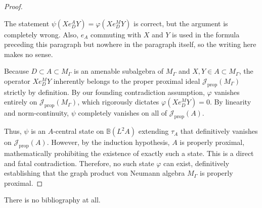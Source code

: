 \documentclass[12pt]{article}
\newcommand{\review}[1]{\begin{reviewbox}#1\end{reviewbox}}
\begin{document}
\begin{proof}
\review{The statement $\psi(X e_D^A Y) = \varphi(X e_D^M Y)$ is correct, but the argument is completely wrong. Also, $e_A$ commuting with $X$ and $Y$ is used in the formula preceding this paragraph but nowhere in the paragraph itself, so the writing here makes no sense.}

Because $D \subset A \subset M_\Gamma$ is an amenable subalgebra of $M_\Gamma$ and $X, Y \in A \subset M_\Gamma$, the operator $X e_D^M Y$ inherently belongs to the proper proximal ideal $\mathcal{J}_{\mathrm{prop}}(M_\Gamma)$ strictly by definition. 
By our founding contradiction assumption, $\varphi$ vanishes entirely on $\mathcal{J}_{\mathrm{prop}}(M_\Gamma)$, which rigorously dictates $\varphi(X e_D^M Y) = 0$. 
By linearity and norm-continuity, $\psi$ completely vanishes on all of $\mathcal{J}_{\mathrm{prop}}(A)$.

Thus, $\psi$ is an $A$-central state on $\mathbb{B}(L^2A)$ extending $\tau_A$ that definitively vanishes on $\mathcal{J}_{\mathrm{prop}}(A)$. However, by the induction hypothesis, $A$ is properly proximal, mathematically prohibiting the existence of exactly such a state. 
This is a direct and fatal contradiction. Therefore, no such state $\varphi$ can exist, definitively establishing that the graph product von Neumann algebra $M_\Gamma$ is properly proximal.
\end{proof}

\review{There is no bibliography at all.}
\end{document}
